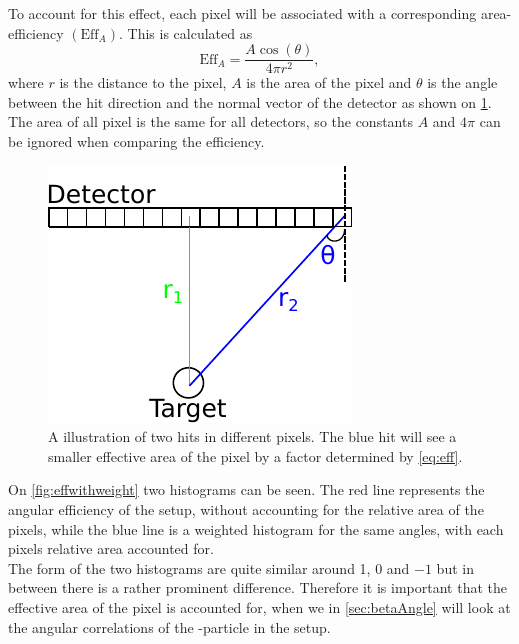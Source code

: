 To account for this effect, each pixel will be associated with a corresponding area-efficiency $(\text{Eff}_A)$.
This is calculated as 
\begin{equation}
\text{Eff}_A = \dfrac{A\cos(\theta) }{ 4 \pi r^2},
\label{eq:eff}
\end{equation}
where $r$ is the distance to the pixel, $A$ is the area of the pixel and $\theta$ is the angle between the hit direction and the normal vector of the detector as shown on \cref{fig:EffGeometry}. The area of all pixel is the same for all detectors, so the constants $A$ and $4\pi$ can be ignored when comparing the efficiency. 


\begin{figure}[H]
	\centering
	\includegraphics[width=.7\linewidth]{../figures/detektorEffDrawingv2.pdf}
	\caption{A illustration of two hits in different pixels. The blue hit will see a smaller effective area of the pixel by a factor determined by \cref{eq:eff}.}
	\label{fig:EffGeometry}
\end{figure}

On \cref{fig:effwithweight} two histograms can be seen. The red line represents the angular efficiency of the setup, without accounting for the relative area of the pixels, while the blue line is a weighted histogram for the same angles, with each pixels relative area accounted for. \\
The form of the two histograms are quite similar around 1, 0 and $-1$ but in between there is a rather prominent difference. Therefore it is important that the effective area of the pixel is accounted for, when we in \cref{sec:betaAngle} will look at the angular correlations of the \be-particle in the setup. 



